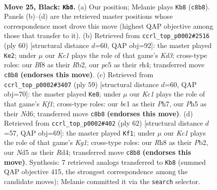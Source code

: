 \documentclass[11pt]{article}
\begin{document}
\clearpage

\begin{figure}[p]\centering
\begin{subfigure}{0.46\textwidth}\centering
\resizebox{\linewidth}{!}{%
\newchessgame
\chessboard[
  setfen={r1k2b1r/p7/B7/2PnpP1p/1P5R/8/8/R1B1K3 b Q - 0 25},
  showmover=false,
  pgfstyle=straightmove, color=movearrow, markmove={c8-b8}
]}
\caption{}
\end{subfigure}\hfill
\begin{subfigure}{0.46\textwidth}\centering
\resizebox{\linewidth}{!}{%
\newchessgame
\chessboard[
  setfen={2k5/1p4p1/pB6/3rn3/P2P3r/3K4/1R3P2/3R4 w - - 6 31},
  showmover=false,
  pgfstyle=straightmove, color=movearrow, markmove={d3-e2}
]}
\caption{}
\end{subfigure}
\\[4pt]
\begin{subfigure}{0.46\textwidth}\centering
\resizebox{\linewidth}{!}{%
\newchessgame
\chessboard[
  setfen={5k2/3r3p/pp1nr3/5R2/3R4/B3p3/PPP4P/3K4 b - - 0 30},
  showmover=false,
  pgfstyle=straightmove, color=movearrow, markmove={f8-e8}
]}
\caption{}
\end{subfigure}\hfill
\begin{subfigure}{0.46\textwidth}\centering
\resizebox{\linewidth}{!}{%
\newchessgame
\chessboard[
  setfen={r5k1/1p6/2p4p/8/3RB2p/4b2P/PP4P1/R5K1 w - - 1 32},
  showmover=false,
  pgfstyle=straightmove, color=movearrow, markmove={g1-f1}
]}
\caption{}
\end{subfigure}
\caption{\textbf{Move 25, Black: \texttt{Kb8}.} (a) Our position; Melanie plays \texttt{Kb8} (\texttt{c8b8}). Panels (b)--(d) are the retrieved master positions whose correspondence most drove this move (highest QAP objective among those that transfer to it). (b) Retrieved from \texttt{ccrl\_top\_p0002\#2516} (ply 60) [structural distance $d$=60, QAP obj=92]: the master played \texttt{Ke2}; under $\mu$ our \emph{Kc1} plays the role of that game's \emph{Kd3}; cross-type roles: our \emph{B}f8 as their \emph{R}b2, our \emph{p}c5 as their \emph{r}h4; transferred move \texttt{c8b8} \textbf{(endorses this move)}. (c) Retrieved from \texttt{ccrl\_top\_p0002\#3407} (ply 59) [structural distance $d$=60, QAP obj=70]: the master played \texttt{Ke8}; under $\mu$ our \emph{Kc1} plays the role of that game's \emph{Kf1}; cross-type roles: our \emph{b}c1 as their \emph{P}h7, our \emph{P}h5 as their \emph{N}d6; transferred move \texttt{c8b8} \textbf{(endorses this move)}. (d) Retrieved from \texttt{ccrl\_top\_p0002\#402} (ply 62) [structural distance $d$=57, QAP obj=69]: the master played \texttt{Kf1}; under $\mu$ our \emph{Kc1} plays the role of that game's \emph{Kg1}; cross-type roles: our \emph{R}h8 as their \emph{P}b2, our \emph{N}d5 as their \emph{R}d4; transferred move \texttt{c8b8} \textbf{(endorses this move)}. Synthesis: 7 retrieved analogs transferred to \texttt{Kb8} (summed QAP objective 415, the strongest correspondence among the candidate moves); Melanie committed it via the \texttt{search} selector.}
\label{fig:thought-m49}
\end{figure}
\end{document}

